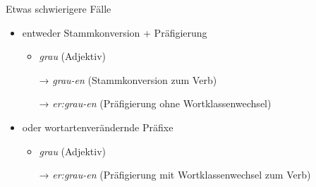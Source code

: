 \begin{frame}
  {Etwas schwierigere Fälle}
  \pause
  \begin{exe}
    \ex
    \begin{xlist}
    \end{xlist}
    \pause
    \ex
    \begin{xlist}
    \end{xlist}
  \end{exe}
  \pause
  \Halbzeile
  \begin{itemize}[<+->]
    \item entweder \alert{Stammkonversion + Präfigierung}
      \begin{itemize}[<+->]
        \item \textit{grau} (Adjektiv)
        \item[→] \textit{grau-en} (Stammkonversion zum Verb)
        \item[→] \textit{er:grau-en} (Präfigierung ohne Wortklassenwechsel)
      \end{itemize}
    \item oder \alert{wortartenverändernde Präfixe}
      \begin{itemize}[<+->]
        \item \textit{grau} (Adjektiv)
        \item[→] \textit{er:grau-en} (Präfigierung mit Wortklassenwechsel zum Verb)
      \end{itemize}
  \end{itemize}
\end{frame}

